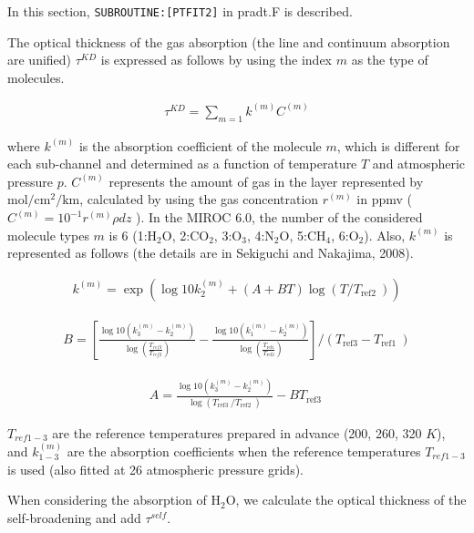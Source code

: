 In this section, \texttt{SUBROUTINE:{[}PTFIT2{]}} in pradt.F is described.

The optical thickness of the gas absorption (the line and continuum absorption are unified) \(\tau^{K D}\) is expressed as follows by using the index \(m\) as the type of molecules.

\begin{eqnarray}
\tau^{KD}=\sum_{m=1} k^{(m)} C^{(m)}
\end{eqnarray}

where \(k^{(m)}\) is the absorption coefficient of the molecule \(m\), which is different for each sub-channel and determined as a function of temperature \(T\) and atmospheric pressure \(p\).
\(C^{(m)}\) represents the amount of gas in the layer represented by \(\mathrm{mol} / \mathrm{cm}^{2} / \mathrm{km}\), calculated by using the gas concentration \(r^{(m)}\) in ppmv (
\(C^{(m)}=10^{-1} r^{(m)} \rho d z\) ). In the MIROC 6.0, the number of the considered molecule types \(m\) is 6 (1:\(\mathrm{H_2} \mathrm{O}\), 2:\(\mathrm{CO_2}\), 3:\(\mathrm{O_3}\),
4:\(\mathrm{N_2} \mathrm{O}\), 5:\(\mathrm{CH_4}\), 6:\(\mathrm{O_2}\)). Also, \(k^{(m)}\) is represented as follows (the details are in Sekiguchi and Nakajima, 2008).

\begin{eqnarray}
k^{(m)}=\exp \left(\log 10 k_{2}^{(m)}+(A+B T) \log \left(T / T_{\text {ref2 } }\right)\right)
\end{eqnarray}

\begin{eqnarray}
B=\left[\frac{\log 10\left(k_{3}^{(m)}-k_{2}^{(m)}\right)}{\log \left(\frac{T_{r e f 3}}{T_{r e f 2}}\right)}-\frac{\log 10\left(k_{1}^{(m)}-k_{2}^{(m)}\right)}{\log \left(\frac{T_{\text {ref1} }}{T_{\text {ref2}}}\right)}\right] /\left(T_{\text {ref3}}-T_{\text {ref1 }}\right)
\end{eqnarray}

\begin{eqnarray}
A=\frac{\log 10\left(k_{3}^{(m)}-k_{2}^{(m)}\right)}{\log \left(T_{\text {ref3 } } / T_{\text {ref2 } }\right)}-B T_{\text {ref3 }}
\end{eqnarray}

\(T_{ref1-3}\) are the reference temperatures prepared in advance (200, 260, 320 \(K\)), and \(k_{1-3}^{(m)}\) are the absorption coefficients when the reference temperatures \(T_{ref1-3}\) is used
(also fitted at 26 atmospheric pressure grids).

When considering the absorption of \(\mathrm{H_2O}\), we calculate the optical thickness of the self-broadening and add \(\tau^{self}\).

